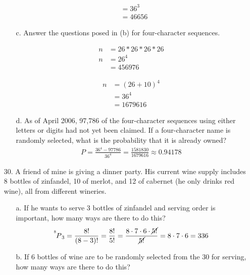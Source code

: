 \documentclass[letterpaper,12pt]{article}
\newcommand\perm[2]{\prescript{^{#1}\mkern-2.5mu}{}P_{#2}}
\begin{document}
\begin{enumerate}
\begin{enumerate}
\begin{minipage}{.5\linewidth}
\begin{align*}
            &= 36^3 \\
            &= 46656
          \end{align*}
        \end{minipage}
      \item[c.]
        Answer the questions posed in (b) for four-character sequences.
        \begin{minipage}{.5\linewidth}
          \begin{align*}
            n &= 26 * 26 * 26 * 26 \\
            n &= 26^4 \\
            &= 456976
          \end{align*}
        \end{minipage}%
        \begin{minipage}{.5\linewidth}
          \begin{align*}
            n &= (26 + 10)^4 \\
            &= 36^4 \\
            &= 1679616
          \end{align*}
        \end{minipage}
      \item[d.]
        As of April 2006, 97,786 of the four-character sequences using either letters or digits had not yet been claimed. If a four-character name is randomly selected, what is the probability that it is already owned?
        \begin{align*}
          P = \frac{36^4 - 97786}{36^4} = \frac{1581830}{1679616} \approx 0.94178
        \end{align*}
    \end{enumerate}
  \item[30.]
    A friend of mine is giving a dinner party. His current wine supply includes 8 bottles of zinfandel, 10 of merlot, and 12 of cabernet (he only drinks red wine), all from different wineries.
    \begin{enumerate}
      \item[a.]
        If he wants to serve 3 bottles of zinfandel and serving order is important, how many ways are there to do this?
        \begin{align*}
          \perm{8}{3} = \frac{8!}{(8 - 3)!} = \frac{8!}{5!} = \frac{8 \cdot 7 \cdot 6 \cdot \cancel{5!}}{\cancel{5!}} = 8 \cdot 7 \cdot 6 = 336
        \end{align*}
      \item[b.]
        If 6 bottles of wine are to be randomly selected from the 30 for serving, how many ways are there to do this?

\end{enumerate}
\end{enumerate}
\end{document}
